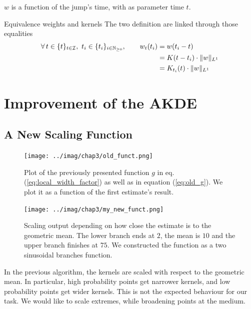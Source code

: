 \documentclass[11pt]{book}
\newcommand{\sequence}[1]{\{ #1 \}_{ i \in \N} }
\newcommand{\sequencetime}{\{t\}_{t \in \mathcal I} }
\begin{document}
\begin{definition}
$w$ is a function of the jump's time, with as parameter time $t$.
\end{definition}

\begin{theoreme}[label = thrm:equiv_w_k]{Equivalence weights and kernels}
The two definition are linked through those equalities
\begin{align*}
\forall t \in \sequencetime, \ t_i \in \sequence{t_i }, \qquad w_t(t_i) 
&= w(t_i - t) \\
&=  K(t - t_i) \cdot \norm{w}_{L^1} \\
&= K_{t_i}(t) \cdot \norm{w}_{L^1}
\end{align*}
\end{theoreme}





\section{Improvement of the AKDE}
\subsection{A New Scaling Function}


\begin{figure}
\centering
\texttt{[image: ../imag/chap3/old\_funct.png]}
\caption{Plot of the previously presented function $g$ in eq. (\ref{eq:local_width_factor}) as well as in equation (\ref{eq:old_g}). We plot it as a function of the first estimate's result.}
\label{fig:old_scaling}
\end{figure}


\begin{figure}
\centering
\texttt{[image: ../imag/chap3/my\_new\_funct.png]}
\caption{Scaling output depending on how close the estimate is to the geometric mean. The lower branch ends at $2$, the mean is $10$ and the upper branch finishes at $75$. We constructed the function as a two sinusoidal branches function.}
\label{fig:new_scaling}
\end{figure}

In the previous algorithm, the kernels are scaled with respect to the geometric mean. In particular, high probability points get narrower kernels, and low probability points get wider kernels. This is not the expected behaviour for our task. We would like to scale extremes, while broadening points at the medium.
\end{document}

